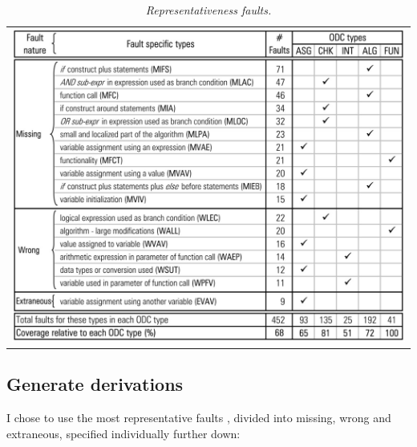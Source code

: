 \begin{table}[!ht]
\begin{tabular}{c}
\includegraphics[width=1\textwidth]{img/representative_faults.jpg}
\end{tabular}
\caption{\small \sl Representativeness faults.\label{tab:representative_faults}}
\end{table}

\subsection{Generate derivations}

I chose to use the most representative faults \cite{duraes2006emulation}, divided into missing, wrong and extraneous, specified individually further down:


